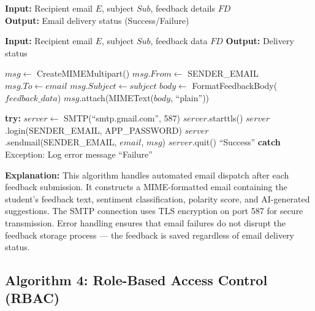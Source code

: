 \textbf{Input:} Recipient email $E$, subject $Sub$, feedback details $FD$ \\
\textbf{Output:} Email delivery status (Success/Failure)

\begin{algorithm}[H]
\caption{SMTP Email Notification Dispatch}
\begin{algorithmic}[1]

\State \textbf{Input:} Recipient email $E$, subject $Sub$, feedback data $FD$
\State \textbf{Output:} Delivery status

    \State $msg \gets$ CreateMIMEMultipart()
    \State $msg.From \gets$ SENDER\_EMAIL
    \State $msg.To \gets email$
    \State $msg.Subject \gets subject$
    \State $body \gets$ FormatFeedbackBody($feedback\_data$)
    \State $msg$.attach(MIMEText($body$, ``plain''))
    
    \State \textbf{try:}
    \State \hspace{1em} $server \gets$ SMTP(``smtp.gmail.com'', 587)
    \State \hspace{1em} $server$.starttls() 
    \State \hspace{1em} $server$.login(SENDER\_EMAIL, APP\_PASSWORD)
    \State \hspace{1em} $server$.sendmail(SENDER\_EMAIL, $email$, $msg$)
    \State \hspace{1em} $server$.quit()
    \State \hspace{1em} \Return ``Success''
    \State \textbf{catch} Exception:
    \State \hspace{1em} Log error message
    \State \hspace{1em} \Return ``Failure''
\EndFunction

\end{algorithmic}
\end{algorithm}

\textbf{Explanation:}
This algorithm handles automated email dispatch after each feedback submission. It constructs a MIME-formatted email containing the student's feedback text, sentiment classification, polarity score, and AI-generated suggestions. The SMTP connection uses TLS encryption on port 587 for secure transmission. Error handling ensures that email failures do not disrupt the feedback storage process — the feedback is saved regardless of email delivery status.

\subsection{Algorithm 4: Role-Based Access Control (RBAC)}


